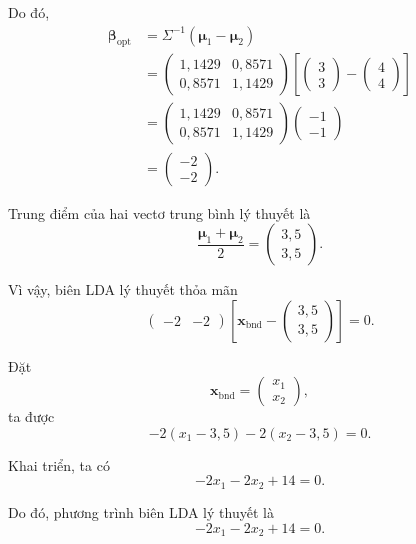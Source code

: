 Do đó,
\[
\begin{aligned}
	\bm{\beta}_{\text{opt}}
	&=
	\Sigma^{-1}(\bm{\mu}_1-\bm{\mu}_2) \\[0.2cm]
	&=
	\begin{pmatrix}
		1{,}1429 & 0{,}8571\\
		0{,}8571 & 1{,}1429
	\end{pmatrix}
	\left[
	\begin{pmatrix}
		3\\
		3
	\end{pmatrix}
	-
	\begin{pmatrix}
		4\\
		4
	\end{pmatrix}
	\right] \\[0.2cm]
	&=
	\begin{pmatrix}
		1{,}1429 & 0{,}8571\\
		0{,}8571 & 1{,}1429
	\end{pmatrix}
	\begin{pmatrix}
		-1\\
		-1
	\end{pmatrix} \\[0.2cm]
	&=
	\begin{pmatrix}
		-2\\
		-2
	\end{pmatrix}.
\end{aligned}
\]

Trung điểm của hai vectơ trung bình lý thuyết là
\[
\frac{\bm{\mu}_1+\bm{\mu}_2}{2}
=
\begin{pmatrix}
	3{,}5\\
	3{,}5
\end{pmatrix}.
\]

Vì vậy, biên LDA lý thuyết thỏa mãn
\[
\begin{pmatrix}
	-2 & -2
\end{pmatrix}
\left[
\bm{x}_{\text{bnd}}
-
\begin{pmatrix}
	3{,}5\\
	3{,}5
\end{pmatrix}
\right]
=
0.
\]

Đặt
\[
\bm{x}_{\text{bnd}}
=
\begin{pmatrix}
	x_1\\
	x_2
\end{pmatrix},
\]
ta được
\[
-2(x_1-3{,}5)-2(x_2-3{,}5)=0.
\]

Khai triển, ta có
\[
-2x_1-2x_2+14=0.
\]

Do đó, phương trình biên LDA lý thuyết là
\[
-2x_1-2x_2+14=0.
\]

